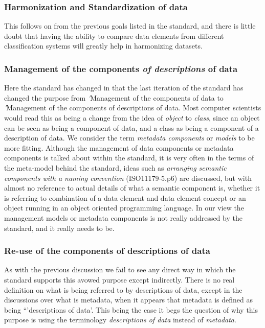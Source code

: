 \documentclass{llncs}
\begin{document}
\subsubsection{Harmonization and Standardization of data}

This follows on from the previous goals listed in the standard, and there is little doubt that having the ability to compare data elements from different classification systems will greatly help in harmonizing datasets.

\subsubsection{Management of the components \emph{of descriptions} of data}

Here the standard has changed in that the last iteration of the standard has changed the purpose from \emph'{Management of the components of data} to \emph'{Management of the components of descriptions of data}. Most computer scientists would read this as being a change from the idea of \emph{object} to \emph{class}, since an object can be seen as being a component of data, and a class as being a component of a description of data. We consider the term \emph{metadata components} or \emph{models} to be more fitting. Although the management of data components or metadata components is talked about within the standard, it is very often in the terms of the meta-model behind the standard, ideas such as \emph{arranging semantic components with a naming convention} (ISO11179-5.p6) are discussed, but with almost no reference to actual details of what a semantic component is, whether it is referring to combination of a data element and data element concept or an object running in an object oriented programming language. In our view the management models or metadata components is not really addressed by the standard, and it really needs to be.

\subsubsection{Re-use of the components of descriptions of data}

As with the previous discussion we fail to see any direct way in which the standard supports this avowed purpose except indirectly. There is no real definition on what is being referred to by descriptions of data, except in the discussions over what is metadata, when it appears that metadata is defined as being ``'descriptions of data'. This being the case it begs the question of why this purpose is using the terminology \emph{descriptions of data} instead of \emph{metadata}. 
\end{document}
